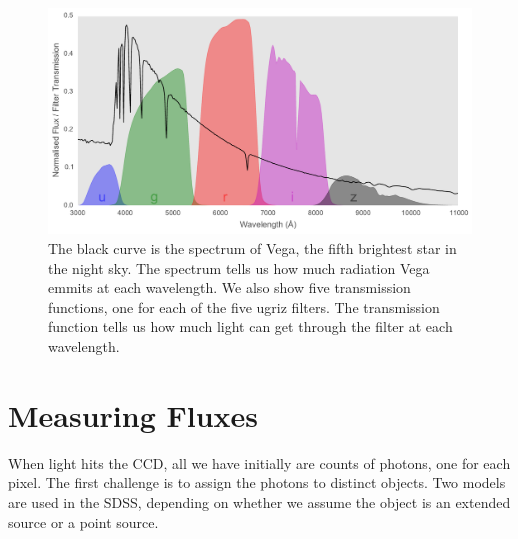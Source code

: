 \begin{figure}[tbp]
	\centering
	\includegraphics[width=\textwidth]{figures/vega_filters_and_spectrum}
	\caption[The spectrum of the star Vega and the ugriz bandpasses]{The black curve
		is the spectrum of Vega, the fifth brightest star in the night sky. The spectrum
		tells us how much radiation Vega emmits at each wavelength. We also show five
		transmission functions, one for each of the five ugriz filters. The transmission
		function tells us how much light can get through the filter at each wavelength.}
	\label{fig:vega} 
\end{figure}


\section{Measuring Fluxes}
\label{sec:mag}
When light hits the CCD, all we have initially are counts of photons, one for each pixel.
The first challenge is to assign the photons to distinct objects. Two models are used
in the SDSS, depending on whether we assume the object is an extended source or a point source.


